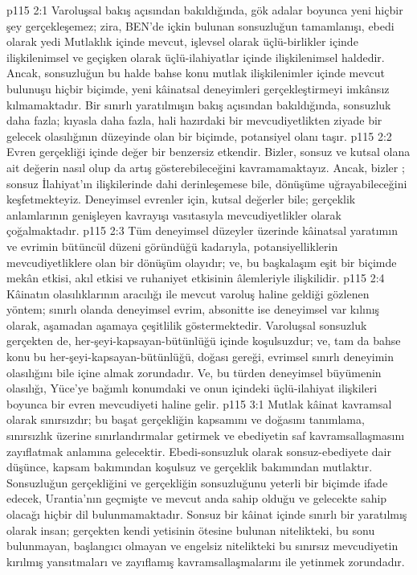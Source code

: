 \vs p115 2:1 Varoluşsal bakış açısından bakıldığında, gök adalar boyunca yeni hiçbir şey gerçekleşemez; zira, BEN’de içkin bulunan sonsuzluğun tamamlanışı, ebedi olarak yedi Mutlaklık içinde mevcut, işlevsel olarak üçlü\hyp{}birlikler içinde ilişkilenimsel ve geçişken olarak üçlü\hyp{}ilahiyatlar içinde ilişkilenimsel haldedir. Ancak, sonsuzluğun bu halde bahse konu mutlak ilişkilenimler içinde mevcut bulunuşu hiçbir biçimde, yeni kâinatsal deneyimleri gerçekleştirmeyi imkânsız kılmamaktadır. Bir sınırlı yaratılmışın bakış açısından bakıldığında, sonsuzluk daha fazla; kıyasla daha fazla, hali hazırdaki bir mevcudiyetlikten ziyade bir gelecek olasılığının düzeyinde olan bir biçimde, potansiyel olanı taşır.
\vs p115 2:2 Evren gerçekliği içinde değer bir benzersiz etkendir. Bizler, sonsuz ve kutsal olana ait değerin nasıl olup da artış gösterebileceğini kavramamaktayız. Ancak, bizler ; sonsuz İlahiyat’ın ilişkilerinde dahi derinleşemese bile, dönüşüme uğrayabileceğini keşfetmekteyiz. Deneyimsel evrenler için, kutsal değerler bile; gerçeklik anlamlarının genişleyen kavrayışı vasıtasıyla mevcudiyetlikler olarak çoğalmaktadır.
\vs p115 2:3 Tüm deneyimsel düzeyler üzerinde kâinatsal yaratımın ve evrimin bütüncül düzeni göründüğü kadarıyla, potansiyelliklerin mevcudiyetliklere olan bir dönüşüm olayıdır; ve, bu başkalaşım eşit bir biçimde mekân etkisi, akıl etkisi ve ruhaniyet etkisinin âlemleriyle ilişkilidir.
\vs p115 2:4 Kâinatın olasılıklarının aracılığı ile mevcut varoluş haline geldiği gözlenen yöntem; sınırlı olanda deneyimsel evrim, absonitte ise deneyimsel var kılınış olarak, aşamadan aşamaya çeşitlilik göstermektedir. Varoluşsal sonsuzluk gerçekten de, her\hyp{}şeyi\hyp{}kapsayan\hyp{}bütünlüğü içinde koşulsuzdur; ve, tam da bahse konu bu her\hyp{}şeyi\hyp{}kapsayan\hyp{}bütünlüğü, doğası gereği, evrimsel sınırlı deneyimin olasılığını bile içine almak zorundadır. Ve, bu türden deneyimsel büyümenin olasılığı, Yüce’ye bağımlı konumdaki ve onun içindeki üçlü\hyp{}ilahiyat ilişkileri boyunca bir evren mevcudiyeti haline gelir.
\vs p115 3:1 Mutlak kâinat kavramsal olarak sınırsızdır; bu başat gerçekliğin kapsamını ve doğasını tanımlama, sınırsızlık üzerine sınırlandırmalar getirmek ve ebediyetin saf kavramsallaşmasını zayıflatmak anlamına gelecektir. Ebedi\hyp{}sonsuzluk olarak sonsuz\hyp{}ebediyete dair düşünce, kapsam bakımından koşulsuz ve gerçeklik bakımından mutlaktır. Sonsuzluğun gerçekliğini ve gerçekliğin sonsuzluğunu yeterli bir biçimde ifade edecek, Urantia’nın geçmişte ve mevcut anda sahip olduğu ve gelecekte sahip olacağı hiçbir dil bulunmamaktadır. Sonsuz bir kâinat içinde sınırlı bir yaratılmış olarak insan; gerçekten kendi yetisinin ötesine bulunan nitelikteki, bu sonu bulunmayan, başlangıcı olmayan ve engelsiz nitelikteki bu sınırsız mevcudiyetin kırılmış yansıtmaları ve zayıflamış kavramsallaşmalarını ile yetinmek zorundadır.

